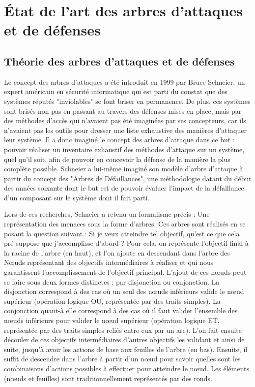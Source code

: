 \section{\'Etat de l'art des arbres d'attaques et de défenses}
    \subsection{Théorie des arbres d'attaques et de défenses}
        Le concept des arbres d'attaques a été introduit en 1999 par Bruce Schneier, un expert américain en sécurité informatique qui est parti du constat que des systèmes réputés "inviolables" se font briser en permanence. De plus, ces systèmes sont brisés non pas en passant au travers des défenses mises en place, mais par des méthodes d'accès qui n'avaient pas été imaginées par ses concepteurs, car ils n'avaient pas les outils pour dresser une liste exhaustive des manières d'attaquer leur système. Il a donc imaginé le concept des arbres d'attaque dans ce but : pouvoir réaliser un inventaire exhaustif des méthodes d'attaque sur un système, quel qu'il soit, afin de pouvoir en concevoir la défense de la manière la plus complète possible. Schneier a lui-même imaginé son modèle d'arbre d'attaque à partir du concept des "Arbres de Défaillances", une méthodologie datant du début des années soixante dont le but est de pouvoir évaluer l'impact de la défaillance d'un composant sur le système dont il fait parti. 

		Lors de ces recherches, Schneier a retenu un formalisme précis : Une représentation des menaces sous la forme d'arbres. Ces arbres sont réalisés en se posant la question suivant : Si je veux atteindre tel objectif, qu'est ce que cela pré-suppose que j'accomplisse d'abord ? Pour cela, on représente l'objectif final à la racine de l'arbre (en haut), et l'on ajoute en descendant dans l'arbre des Nœuds représentant des objectifs intermédiaires à réaliser et qui nous garantissent l'accomplissement de l'objectif principal. L'ajout de ces nœuds peut se faire sous deux formes distinctes : par disjonction ou conjonction. La disjonction correspond à des cas où un seul des nœuds inférieurs valide le nœud supérieur (opération logique OU, représentée par des traits simples). La conjonction quant-à elle correspond à des cas où il faut valider l'ensemble des nœuds inférieurs pour valider le nœud supérieur (opération logique ET, représentée par des traits simples reliés entre eux par un arc). L'on fait ensuite découler de ces objectifs intermédiaires d'autres objectifs les validant et ainsi de suite, jusqu'à avoir les actions de base aux feuilles de l'arbre (en bas). Ensuite, il suffit de descendre dans l'arbre à partir d'un nœud pour savoir quelles sont les combinaisons d'actions possibles à effectuer pour atteindre le nœud. Les éléments (nœuds et feuilles) sont traditionnellement représentés par des ronds.

